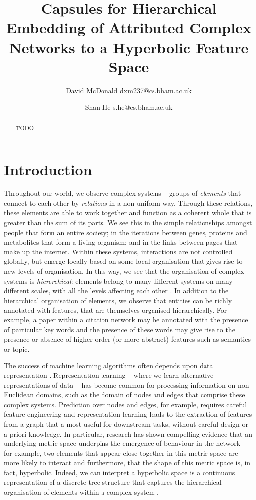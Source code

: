 \documentclass{IEEEtran}
\title{Capsules for Hierarchical Embedding of Attributed Complex Networks to a Hyperbolic Feature Space}
\author{David McDonald dxm237@cs.bham.ac.uk \and Shan He s.he@cs.bham.ac.uk}
\date{}
\begin{document}
	
	\maketitle
	
	\begin{abstract}
		TODO
	\end{abstract}
	
	\section{Introduction}
	
	Throughout our world, we observe complex systems -- groups of \textit{elements} that connect to each other by \textit{relations} in a non-uniform way. 
	Through these relations, these elements are able to work together and function as a coherent whole that is greater than the sum of its parts.
	We see this in the simple relationships amongst people that form an entire society; in the iterations between genes, proteins and metabolites that form a living organism; and in the links between pages that make up the internet.
	Within these systems, interactions are not controlled globally, but emerge locally based on some local organisation that gives rise to new levels of organisation.
	In this way, we see that the organisation of complex systems is \textit{hierarchical}: elements belong to many different systems on many different scales, with all the levels affecting each other \cite{barabasi1999emergence}.   
	In addition to the hierarchical organisation of elements, we observe that entities can be richly annotated with features, that are themselves organised hierarchically.  
	For example, a paper within a citation network may be annotated with the presence of particular key words and the presence of these words may give rise to the presence or absence of higher order (or more abstract) features such as semantics or topic. 
	
	The success of machine learning algorithms often depends upon data representation \cite{bengio2013representation}.
	Representation learning -- where we learn alternative representations of data -- has become common for processing information on non-Euclidean domains, such as the domain of nodes and edges that comprise these complex systems.  
	Prediction over nodes and edges, for example, requires careful feature engineering \cite{grover2016node2vec} and representation learning leads to the extraction of features from a graph that a most useful for downstream tasks, without careful design or a-priori knowledge.
	In particular, research has shown compelling evidence that an underlying metric space underpins the emergence of behaviour in the network -- for example, two elements that appear close together in this metric space are more likely to interact \cite{grover2016node2vec,alanis2016efficient,alanis2016manifold} and furthermore, that the shape of this metric space is, in fact, hyperbolic.
	Indeed, we can interpret a hyperbolic space is a continuous representation of a discrete tree structure that captures the hierarchical organisation of elements within a complex system \cite{krioukov2010hyperbolic}.
	
\end{document}
